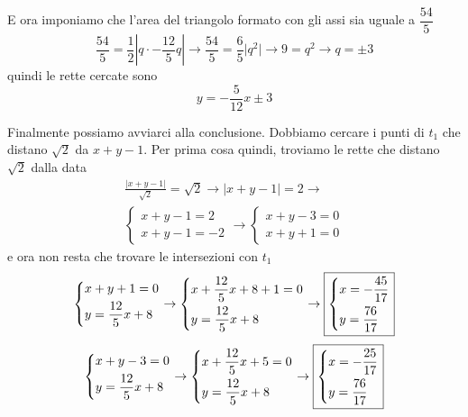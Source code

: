 E ora imponiamo che l'area del triangolo formato con gli assi sia uguale a $\dfrac{54}{5}$
\begin{equation*}
  \frac{54}{5} = \frac{1}{2}\left\lvert q\cdot-\frac{12}{5}q\right\rvert \rightarrow
  \frac{54}{5} = \frac{6}{5}\lvert q^2\rvert \rightarrow 9 = q^2 \rightarrow q = \pm3
\end{equation*}
quindi le rette cercate sono
\begin{equation*}
  \boxed{y = -\frac{5}{12}x\pm3}
\end{equation*}

Finalmente possiamo avviarci alla conclusione. Dobbiamo cercare i punti di $t_1$ che distano 
$\sqrt{2}$ da $x+y-1$. Per prima cosa quindi, troviamo le rette che distano $\sqrt{2}$ dalla data
\begin{align*}
  \frac{\lvert x+y-1\rvert}{\sqrt{2}} = \sqrt{2} \rightarrow \lvert x+y-1\rvert = 2 \rightarrow\\
  \begin{cases}
    x+y-1=2\\
    x+y-1=-2
  \end{cases} \rightarrow
  \begin{cases}
    x+y-3=0\\
    x+y+1=0
  \end{cases}
\end{align*}
e ora non resta che trovare le intersezioni con $t_1$
\begin{equation*}
  \begin{dcases}
    x+y+1=0\\
    y=\frac{12}{5}x+8
  \end{dcases}\rightarrow
  \begin{dcases}
    x+\frac{12}{5}x+8+1=0\\
    y=\frac{12}{5}x+8
  \end{dcases}\rightarrow
  \boxed{\begin{dcases}
      x = -\frac{45}{17}\\
      y = \frac{76}{17}
  \end{dcases}}
\end{equation*}
\begin{equation*}
  \begin{dcases}
    x+y-3=0\\
    y=\frac{12}{5}x+8
  \end{dcases}\rightarrow
  \begin{dcases}
    x+\frac{12}{5}x+5=0\\
    y=\frac{12}{5}x+8
  \end{dcases}\rightarrow
  \boxed{\begin{dcases}
      x = -\frac{25}{17}\\
      y = \frac{76}{17}
  \end{dcases}}
\end{equation*}

